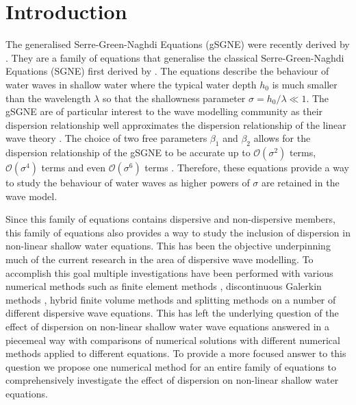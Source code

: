 \documentclass[10pt]{elsarticle}
\begin{document}
\section{Introduction}
The generalised Serre-Green-Naghdi Equations (gSGNE) were recently derived by \citet{Clamond-Dutykh-2018-237}. They are a family of equations that generalise the classical Serre-Green-Naghdi Equations (SGNE) first derived by \citet{Serre-F-1953-857}. The equations describe the behaviour of water waves in shallow water where the typical water depth $h_0$ is much smaller than the wavelength $\lambda$ so that the shallowness parameter $\sigma = h_0/\lambda \ll 1$. The gSGNE are of particular interest to the wave modelling community as their dispersion relationship well approximates the dispersion relationship of the linear wave theory \cite{Whitham-1967-399}. The choice of two free parameters $\beta_1$ and $\beta_2$ allows for the dispersion relationship of the gSGNE to be accurate up to $\mathcal{O}\left(\sigma^2\right)$ terms, $\mathcal{O}\left(\sigma^4\right)$ terms and even $\mathcal{O}\left(\sigma^6\right)$ terms \cite{Clamond-Dutykh-2018-237,Clamond-et.al-2017-245}. Therefore, these equations provide a way to study the behaviour of water waves as higher powers of $\sigma$ are retained in the wave model. 

Since this family of equations contains dispersive and non-dispersive members, this family of equations also provides a way to study the inclusion of dispersion in non-linear shallow water equations. This has been the objective underpinning much of the current research in the area of dispersive wave modelling. To accomplish this goal multiple investigations have been performed with various numerical methods such as finite element methods \cite{Clamond-et.al-2017-245}, discontinuous Galerkin methods \cite{DONG-2016-110,PANDA-2014-572,LI-2019-108953}, hybrid finite volume methods \cite{Hank-etal-2010-2034,Zoppou-etal-2016} and splitting methods \cite{LANNES-2015-238,Filippini-etal-2016-381,doCarmo-etal-2018-404} on a number of different dispersive wave equations. This has left the underlying question of the effect of dispersion on non-linear shallow water wave equations answered in a piecemeal way with comparisons of numerical solutions with different numerical methods applied to different equations. To provide a more focused answer to this question we propose one numerical method for an entire family of equations to comprehensively investigate the effect of dispersion on non-linear shallow water equations.
\end{document}

